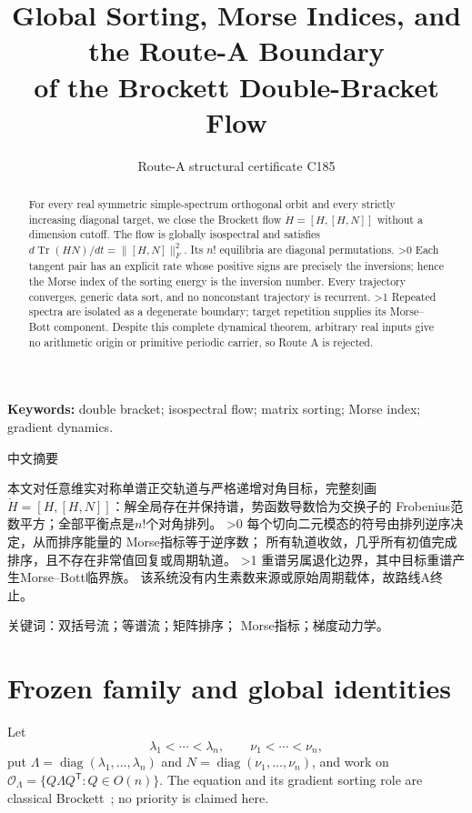 \documentclass[9pt]{extarticle}
\title{Global Sorting, Morse Indices, and the Route-A Boundary\\
of the Brockett Double-Bracket Flow}
\author{Route-A structural certificate C185}
\date{}
\begin{document}
\maketitle
\begin{abstract}
For every real symmetric simple-spectrum orthogonal orbit and every strictly
increasing diagonal target, we close the Brockett flow
$\dot H=[H,[H,N]]$ without a dimension cutoff.  The flow is globally
isospectral and satisfies
$d\operatorname{Tr}(HN)/dt=\lVert[H,N]\rVert_F^2$.
Its $n!$ equilibria are diagonal permutations.
\ifnum\CRevisionRound>0
Each tangent pair has an explicit rate whose positive signs are precisely the
inversions; hence the Morse index of the sorting energy is the inversion
number.  Every trajectory converges, generic data sort, and no nonconstant
trajectory is recurrent.
\fi
\ifnum\CRevisionRound>1
Repeated spectra are isolated as a degenerate boundary; target repetition
supplies its Morse--Bott component.  Despite this complete dynamical theorem,
arbitrary real inputs give no arithmetic origin or primitive periodic carrier,
so Route A is rejected.
\fi
\end{abstract}
\noindent\textbf{Keywords:} double bracket; isospectral flow; matrix sorting;
Morse index; gradient dynamics.

\begin{otherlanguage}{chinese-simplified}
\begin{center}{\large 中文摘要}\end{center}
本文对任意维实对称单谱正交轨道与严格递增对角目标，完整刻画
$\dot H=[H,[H,N]]$：解全局存在并保持谱，势函数导数恰为交换子的
\foreignlanguage{english}{Frobenius}范数平方；全部平衡点是$n!$个对角排列。
\ifnum\CRevisionRound>0
每个切向二元模态的符号由排列逆序决定，从而排序能量的
\foreignlanguage{english}{Morse}指标等于逆序数；
所有轨道收敛，几乎所有初值完成排序，且不存在非常值回复或周期轨道。
\fi
\ifnum\CRevisionRound>1
重谱另属退化边界，其中目标重谱产生\foreignlanguage{english}{Morse--Bott}临界族。
该系统没有内生素数来源或原始周期载体，故路线\foreignlanguage{english}{A}终止。
\fi

\noindent 关键词：双括号流；等谱流；矩阵排序；
\foreignlanguage{english}{Morse}指标；梯度动力学。
\end{otherlanguage}

\section{Frozen family and global identities}
Let
\[
 \lambda_1<\cdots<\lambda_n,\qquad
 \nu_1<\cdots<\nu_n,
\]
put $\Lambda=\operatorname{diag}(\lambda_1,\ldots,\lambda_n)$ and
$N=\operatorname{diag}(\nu_1,\ldots,\nu_n)$, and work on
$\mathcal O_\Lambda=\{Q\Lambda Q^{\mathsf T}:Q\in O(n)\}$.
The equation and its gradient sorting role are classical
Brockett~\cite{Brockett91}; no priority is claimed here.
\end{document}
